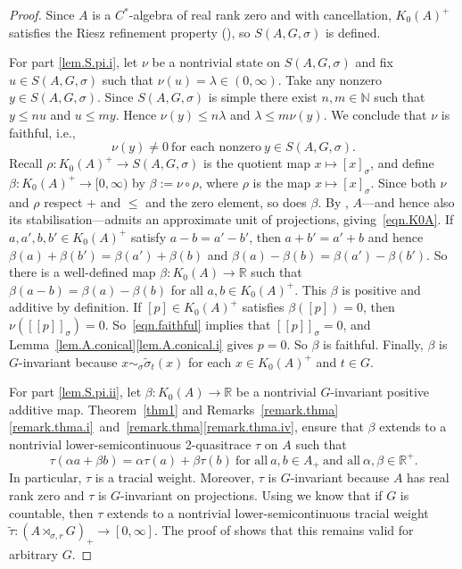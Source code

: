 \documentclass[a4paper, 12pt]{amsart}
\numberwithin{equation}{section}
\theoremstyle{remark}
\theoremstyle{definition}
\begin{document}
\begin{proof}
Since $A$ is a $C^*$-algebra of real rank  zero and with cancellation,  $K_0(A)^+$ satisfies
the Riesz  refinement property (\cite{MR1301484, MR1150618}), so $S(A,G,\sigma)$ is
defined.

For part \eqref{lem.S.pi.i}, let $\nu$ be a nontrivial state on $S(A,G,\sigma)$ and fix $u\in
S(A,G,\sigma)$ such that $\nu(u)=\lambda\in(0,\infty)$. Take any nonzero $y\in
S(A,G,\sigma)$. Since $S(A,G,\sigma)$ is simple there exist $n,m\in {\mathbb{N}}$ such that $y\leq
nu$ and $u\leq my$. Hence $\nu(y)\leq n\lambda$ and $\lambda\leq m\nu(y)$. We conclude
that $\nu$ is faithful, i.e.,
\begin{equation}\label{eqn.faithful}
\nu(y)\neq 0 \ \textrm{for each nonzero}\ y\in S(A,G,\sigma).
\end{equation}
Recall $\rho\colon K_0(A)^+\to S(A,G,\sigma)$ is the quotient map $x\mapsto [x]_\sigma$, and define
$\beta \colon K_0(A)^+\to [0,\infty)$ by $\beta:=\nu\circ \rho$, where $\rho$ is
the map $x\mapsto [x]_\sigma$. Since both $\nu$ and $\rho$ respect $+$ and $\leq$ and the
zero element, so does $\beta$. By \cite[Theorem 2.6]{MR1120918}, $A$---and hence also its
stabilisation---admits an approximate unit of projections, giving~\eqref{eqn.K0A}.
If $a,a',b,b'\in K_0(A)^+$ satisfy $a-b=a'-b'$, then $a+b'=a'+b$ and hence
$\beta(a)+\beta(b')=\beta(a')+\beta(b)$ and $\beta(a)-\beta(b)=\beta(a')-\beta(b')$. So
there is a well-defined map $\beta\colon K_0(A)\to {\mathbb{R}}$  such that
$\beta(a-b)=\beta(a)-\beta(b)$ for all $a,b\in K_0(A)^+$. This $\beta$ is positive and
additive by definition. If $[p]\in K_0(A)^+$ satisfies $\beta([p])=0$, then
$\nu([[p]]_\sigma)=0$. So~\eqref{eqn.faithful} implies that $[[p]]_\sigma=0$, and
Lemma~\ref{lem.A.conical}\eqref{lem.A.conical.i} gives $p=0$. So $\beta$ is faithful. Finally, $\beta$ is
$G$-invariant because $x\sim_{\sigma} \tilde\sigma_t(x)$ for each $x\in K_0(A)^+$ and
$t\in G$.

For part \eqref{lem.S.pi.ii}, let $\beta \colon K_0(A)\to {\mathbb{R}}$ be a nontrivial $G$-invariant positive
additive map. Theorem~\ref{thm1} and Remarks~\ref{remark.thma}\eqref{remark.thma.i}~and~\ref{remark.thma}\eqref{remark.thma.iv}, ensure that
$\beta$ extends to a nontrivial lower-semicontinuous 2-quasitrace $\tau$ on $A$ such that
\[
    \tau(\alpha a + \beta b) = \alpha \tau(a) + \beta \tau(b) \ \textrm{for all} \ a,b\in A_+ \ \textrm{and all} \ \alpha,\beta \in {\mathbb{R}}^+.
\]
In particular, $\tau$ is a tracial
weight. Moreover, $\tau$ is $G$-invariant because $A$ has real rank zero and $\tau$ is
$G$-invariant on projections. Using \cite[Lemma~5.3]{MR2873171} we know that if $G$ is
countable, then $\tau$ extends to a nontrivial lower-semicontinuous tracial weight
$\tilde\tau\colon (A\rtimes_{\sigma,r} G)_+\to [0,\infty]$. The proof of \cite[Lemma
5.4]{EllSie} shows that this remains valid for arbitrary $G$.


\end{proof}
\end{document}
